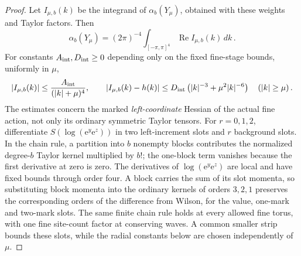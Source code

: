\begin{proof}
Let $I_{\mu,b}(k)$ be the integrand of $\alpha_b(Y_\mu)$, obtained with these weights and Taylor factors. Then
\begin{equation*}
\alpha_b(Y_\mu)=(2\pi)^{-4}\int_{[-\pi,\pi]^4}\operatorname{Re}I_{\mu,b}(k)\,dk\,.
\end{equation*}
For constants $A_{\rm int},D_{\rm int}\ge0$ depending only on the fixed fine-stage bounds, uniformly in $\mu$,
\begin{equation}\label{eq:C-integrand}
|I_{\mu,b}(k)|\le\frac{A_{\rm int}}{(|k|+\mu)^4},\qquad
|I_{\mu,b}(k)-h(k)|\le D_{\rm int}\left(|k|^{-3}+\mu^2|k|^{-6}\right)\quad(|k|\ge\mu)\,.
\end{equation}
The estimates concern the marked \emph{left-coordinate} Hessian of the actual fine action, not only its ordinary symmetric Taylor tensors. For $r=0,1,2$, differentiate $S(\log(\mathrm e^y\mathrm e^z))$ in two left-increment slots and $r$ background slots. In the chain rule, a partition into $b$ nonempty blocks contributes the normalized degree-$b$ Taylor kernel multiplied by $b!$; the one-block term vanishes because the first derivative at zero is zero. The derivatives of $\log(\mathrm e^y\mathrm e^z)$ are local and have fixed bounds through order four. A block carries the sum of its slot momenta, so substituting block momenta into the ordinary kernels of orders $3,2,1$ preserves the corresponding orders of the difference from Wilson, for the value, one-mark and two-mark slots. The same finite chain rule holds at every allowed fine torus, with one fine site-count factor at conserving waves. A common smaller strip bounds these slots, while the radial constants below are chosen independently of~$\mu$.


\end{proof}
